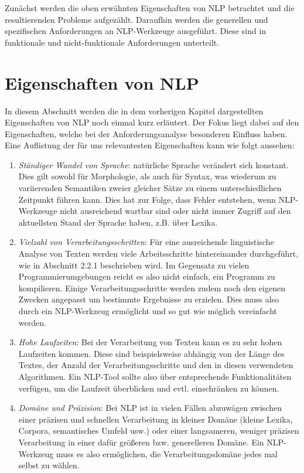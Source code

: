 \documentclass[12pt]{report}
\begin{document}
Zunächst werden die oben erwähnten Eigenschaften von NLP betrachtet und die resultierenden Probleme aufgezählt. Daraufhin werden die generellen und spezifischen Anforderungen an NLP-Werkzeuge ausgeführt. Diese sind in funktionale und nicht-funktionale Anforderungen unterteilt.

\section{Eigenschaften von NLP}
In diesem Abschnitt werden die in dem vorherigen Kapitel dargestellten Eigenschaften von NLP noch einmal kurz erläutert. Der Fokus liegt dabei auf den Eigenschaften, welche bei der Anforderungsanalyse besonderen Einfluss haben. Eine Auflistung der für uns relevantesten Eigenschaften kann wie folgt aussehen:

\begin{enumerate}
\item \textit{Ständiger Wandel von Sprache}: natürliche Sprache verändert sich konstant. Dies gilt sowohl für Morphologie, als auch für Syntax, was wiederum zu variierenden Semantiken zweier gleicher Sätze zu einem unterschiedlichen Zeitpunkt führen kann. Dies hat zur Folge, dass Fehler entstehen, wenn NLP-Werkzeuge nicht ausreichend wartbar sind oder nicht immer Zugriff auf den aktuellsten Stand der Sprache haben, z.B. über Lexika.
\item \textit{Vielzahl von Verarbeitungsschritten}: Für eine ausreichende linguistische Analyse von Texten werden viele Arbeitsschritte hintereinander durchgeführt, wie in Abschnitt 2.2.1 beschrieben wird. Im Gegensatz zu vielen Programmierumgebungen reicht es also nicht einfach, ein Programm zu kompilieren. Einige Verarbeitungsschritte werden zudem noch den eigenen Zwecken angepasst um bestimmte Ergebnisse zu erzielen. Dies muss also durch ein NLP-Werkzeug ermöglicht und so gut wie möglich vereinfacht werden.
\item \textit{Hohe Laufzeiten}: Bei der Verarbeitung von Texten kann es zu sehr hohen Laufzeiten kommen. Diese sind beispielsweise abhängig von der Länge des Textes, der Anzahl der Verarbeitungsschritte und den in diesen verwendeten Algorithmen. Ein NLP-Tool sollte also über entsprechende Funktionalitäten verfügen, um die Laufzeit überblicken und evtl. einschränken zu können. 
\item \textit{Domäne und Präzision}: Bei NLP ist in vielen Fällen abzuwägen zwischen einer präzisen und schnellen Verarbeitung in kleiner Domäne (kleine Lexika, Corpora, semantisches Umfeld usw.) oder einer langsameren, weniger präzisen Verarbeitung in einer dafür größeren bzw. generelleren Domäne. Ein NLP-Werkzeug muss es also ermöglichen, die Verarbeitungsdomäne jedes mal selbst zu wählen.
\end{enumerate}
\end{document}
